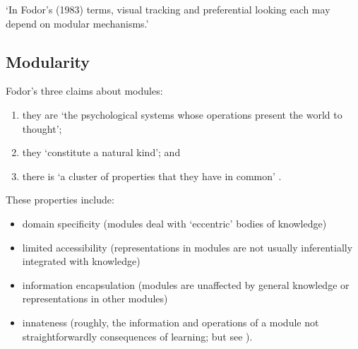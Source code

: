 \documentclass[12pt]{extarticle}
\begin{document}
\begin{multicols}{3}
‘In Fodor’s (1983) terms, visual tracking and preferential looking each may depend on modular mechanisms.’
\citep[p.\ 137]{spelke:1995_spatiotemporal}
 
\subsection{Modularity}
 
Fodor’s three claims about modules:
 
\begin{enumerate}
 
\item they are ‘the psychological systems whose operations present the world to thought’;
 
\item they ‘constitute a natural kind’; and
 
\item there is ‘a cluster of properties that they have in common’ \citep[p.\ 101]{Fodor:1983dg}.
 
\end{enumerate}
 
These properties include:
 
\begin{itemize}
 
\item domain specificity (modules deal with ‘eccentric’ bodies of knowledge)
 
\item limited accessibility (representations in modules are not usually inferentially integrated with knowledge)
 
\item information encapsulation (modules are unaffected by general knowledge or representations in other modules)
 
\item innateness (roughly, the information and operations of a module not straightforwardly consequences of learning; but see \citet{Samuels:2004ho}).
 
\end{itemize}
 
 
 
 
\footnotesize 


\end{multicols}
\end{document}
